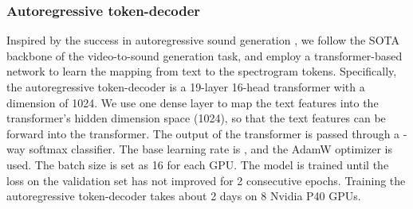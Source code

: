 \documentclass[lettersize,journal]{IEEEtran}
\begin{document}
\subsubsection{Autoregressive token-decoder} Inspired by the success in autoregressive sound generation \cite{iashin2021taming,liu2021conditional}, we follow the SOTA backbone of the video-to-sound generation task, and employ a transformer-based network to learn the mapping from text to the spectrogram tokens. Specifically, the autoregressive token-decoder is a 19-layer 16-head transformer with a dimension of 1024. We use one dense layer to map the text features into the transformer’s hidden dimension space (1024), so that the text features can be forward into the transformer. The output of the transformer is passed through a -way softmax classifier. The base learning rate is , and the AdamW optimizer \cite{loshchilov2017decoupled} is used. The batch size is set as 16 for each GPU. The model is trained until the loss on the validation set has not improved for 2 consecutive epochs. Training the autoregressive token-decoder takes about 2 days on 8 Nvidia P40 GPUs. 
\end{document}
